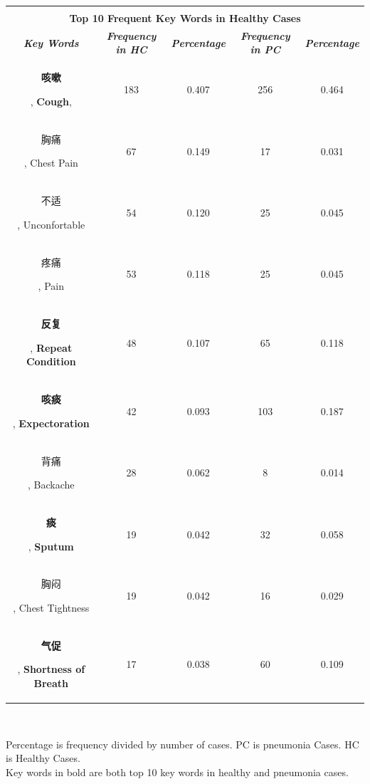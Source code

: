 \documentclass[journal]{IEEEtran}
\begin{document}
\begin{table}[htb]
\begin{center}
\begin{tabular}{c|c|c|c|c}
\hline
\multicolumn{5}{c}{}\\
\multicolumn{5}{c}{\textbf{Top 10 Frequent Key Words in Healthy Cases}} \\
        \hline
        \textbf{\textit{Key Words}} & \textbf{\textit{Frequency in HC}} & \textbf{\textit{Percentage}}& \textbf{\textit{Frequency in PC}}& \textbf{\textit{Percentage}} \\
    \hline
    \begin{CJK}{UTF8}{gbsn}\textbf{咳嗽}\end{CJK}, \textbf{Cough},  & 183 & 0.407 & 256 & 0.464\\
    \begin{CJK}{UTF8}{gbsn}胸痛\end{CJK}, Chest Pain & 67 & 0.149 & 17 & 0.031\\
    \begin{CJK}{UTF8}{gbsn}不适\end{CJK}, Unconfortable & 54 & 0.120 & 25 & 0.045\\
    \begin{CJK}{UTF8}{gbsn}疼痛\end{CJK}, Pain & 53 & 0.118 & 25 & 0.045\\
    \begin{CJK}{UTF8}{gbsn}\textbf{反复}\end{CJK}, \textbf{Repeat Condition} & 48 & 0.107 & 65 & 0.118\\
    \begin{CJK}{UTF8}{gbsn}\textbf{咳痰}\end{CJK}, \textbf{Expectoration} & 42 & 0.093 & 103 & 0.187\\
    \begin{CJK}{UTF8}{gbsn}背痛\end{CJK}, Backache & 28 & 0.062 & 8 & 0.014\\
    \begin{CJK}{UTF8}{gbsn}\textbf{痰}\end{CJK}, \textbf{Sputum}& 19 & 0.042 & 32 & 0.058\\
    \begin{CJK}{UTF8}{gbsn}胸闷\end{CJK}, Chest Tightness & 19 & 0.042 & 16 & 0.029\\
    \begin{CJK}{UTF8}{gbsn}\textbf{气促}\end{CJK}, \textbf{Shortness of Breath}& 17 & 0.038 & 60 & 0.109\\
    
    \hline

\end{tabular}
\vspace{0cm}
\\

\end{center}
\footnotesize{Percentage is frequency divided by number of cases. PC is pneumonia Cases. HC is Healthy Cases. \\
Key words in bold are both top 10 key words in healthy and pneumonia cases.}
\label{frequency1}

\vspace{-0cm}
\end{table}
\end{document}
